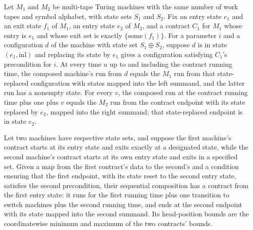 \begin{lemma}
\label{Turing.Contract.seq_traj}
\leanok
{}
Let $M_1$ and $M_2$ be multi-tape Turing machines with the same number of work tapes and
symbol alphabet, with state sets $S_1$ and $S_2$. Fix an entry state $e_1$ and an exit
state $f_1$ of $M_1$, an entry state $e_2$ of $M_2$, and a contract $C_1$ for $M_1$
whose entry is $e_1$ and whose exit set is exactly $\{\mathrm{some}(f_1)\}$. For a parameter $i$
and a configuration $d$ of the machine with state set $S_1\oplus S_2$, suppose $d$ is in
state $(e_1,\mathrm{inl})$ and replacing its state by $e_1$ gives a configuration
satisfying $C_1$'s precondition for $i$. At every time $u$ up to and including the
contract running time, the composed machine's run from $d$ equals the $M_1$ run from
that state-replaced configuration with states mapped into the left summand, and the
latter run has a nonempty state. For every $v$, the composed run at the contract running
time plus one plus $v$ equals the $M_2$ run from the contract endpoint with its state
replaced by $e_2$, mapped into the right summand; that state-replaced endpoint is in
state $e_2$.
\end{lemma}

\begin{definition}
\label{Turing.Contract.seq}
\leanok
{}
Let two machines have respective state sets, and suppose the first machine's contract
starts at its entry state and exits exactly at a designated state, while the second
machine's contract starts at its own entry state and exits in a specified set. Given a
map from the first contract's data to the second's and a condition ensuring that the
first endpoint, with its state reset to the second entry state, satisfies the second
precondition, their sequential composition has a contract from the first entry state: it
runs for the first running time plus one transition to switch machines plus the second
running time, and ends at the second endpoint with its state mapped into the second
summand. Its head-position bounds are the coordinatewise minimum and maximum of the two
contracts' bounds.
\end{definition}

